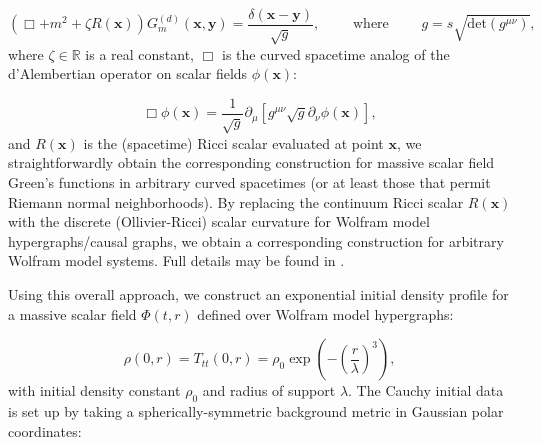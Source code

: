 \documentclass{article}
\begin{document}
\begin{equation}
\left( \Box + m^2 + \zeta R \left( \mathbf{x} \right) \right) G_{m}^{\left( d \right)} \left( \mathbf{x}, \mathbf{y} \right) = \frac{\delta \left( \mathbf{x} - \mathbf{y} \right)}{\sqrt{g}}, \qquad \text{ where } \qquad g = s\sqrt{\mathrm{det} \left( g^{\mu \nu} \right)},
\end{equation}
where ${\zeta \in \mathbb{R}}$ is a real constant, ${\Box}$ is the curved spacetime analog of the d'Alembertian operator on scalar fields ${\phi \left( \mathbf{x} \right)}$:

\begin{equation}
\Box \phi \left( \mathbf{x} \right) = \frac{1}{\sqrt{g}} \partial_{\mu} \left[ g^{\mu \nu} \sqrt{g} \partial_{\nu} \phi \left( \mathbf{x} \right) \right],
\end{equation}
and ${R \left( \mathbf{x} \right)}$ is the (spacetime) Ricci scalar evaluated at point ${\mathbf{x}}$, we straightforwardly obtain the corresponding construction for massive scalar field Green's functions in arbitrary curved spacetimes (or at least those that permit Riemann normal neighborhoods). By replacing the continuum Ricci scalar ${R \left( \mathbf{x} \right)}$ with the discrete (Ollivier-Ricci) scalar curvature for Wolfram model hypergraphs/causal graphs, we obtain a corresponding construction for arbitrary Wolfram model systems. Full details may be found in \cite{gorard5}.

Using this overall approach, we construct an exponential initial density profile for a massive scalar field ${\Phi \left( t, r \right)}$ defined over Wolfram model hypergraphs:

\begin{equation}
\rho \left( 0, r \right) = T_{t t} \left( 0, r \right) = \rho_0 \exp \left( - \left( \frac{r}{\lambda} \right)^3 \right),
\end{equation}
with initial density constant ${\rho_0}$ and radius of support ${\lambda}$. The Cauchy initial data is set up by taking a spherically-symmetric background metric in Gaussian polar coordinates:
\end{document}
